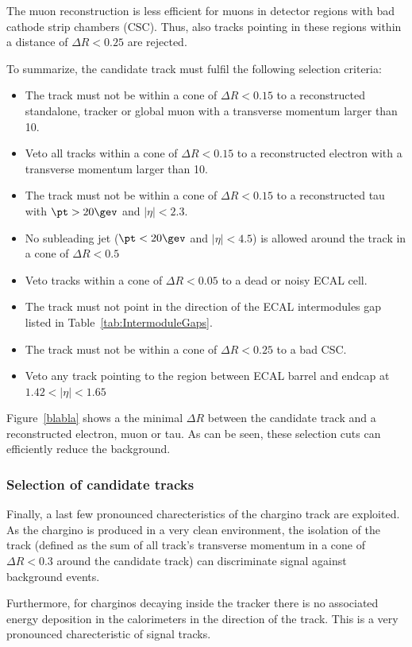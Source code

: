 The muon reconstruction is less efficient for muons in detector regions with bad cathode strip chambers (CSC).
Thus, also tracks pointing in these regions within a distance of $\Delta R<0.25$ are rejected.


To summarize, the candidate track must fulfil the following selection criteria:
\begin{itemize}
\renewcommand{\labelitemi}{\footnotesize{\ding{118}}}
\item The track must not be within a cone of $\Delta R<0.15$ to a reconstructed standalone, tracker or global muon with a transverse momentum larger than 10\gev.
\item Veto all tracks within a cone of $\Delta R<0.15$ to a reconstructed electron with a transverse momentum larger than 10\gev.
\item The track must not be within a cone of $\Delta R<0.15$ to a reconstructed tau with $\pt>20\gev$ and $|\eta|<2.3$.
\item No subleading jet ($\pt<20\gev$ and $|\eta|<4.5$) is allowed around the track in a cone of $\Delta R< 0.5$
\item Veto tracks within a cone of $\Delta R<0.05$ to a dead or noisy ECAL cell.
\item The track must not point in the direction of the ECAL intermodules gap listed in Table~\ref{tab:IntermoduleGaps}.
\item The track must not be within a cone of $\Delta R<0.25$ to a bad CSC.
\item Veto any track pointing to the region between ECAL barrel and endcap at $1.42<|\eta|<1.65$
\end{itemize}
Figure~\ref{blabla} shows a the minimal $\Delta R$ between the candidate track and a reconstructed electron, muon or tau.
As can be seen, these selection cuts can efficiently reduce the \WJets background.

\subsubsection*{Selection of candidate tracks}
Finally, a last few pronounced charecteristics of the chargino track are exploited.
As the chargino is produced in a very clean environment, the isolation of the track (defined as the sum of all track's transverse momentum in a cone of $\Delta R < 0.3$ around the candidate track) can discriminate signal against background events.

Furthermore, for charginos decaying inside the tracker there is no associated energy deposition in the calorimeters in the direction of the track.
This is a very pronounced charecteristic of signal tracks.

